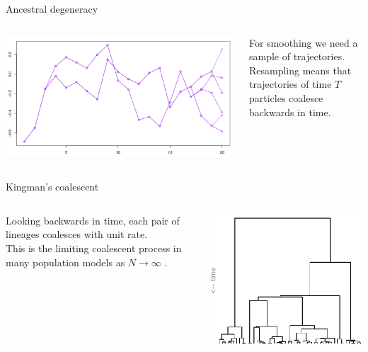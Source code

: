 \documentclass[aspectratio=169]{beamer}
\theoremstyle{definition}
\begin{document}
\begin{frame}{Ancestral degeneracy}
\begin{columns}
\begin{column}{0.6\textwidth}
\includegraphics[width=\textwidth]{../degeneracy.pdf}
\end{column}
\begin{column}{0.35\textwidth}
For smoothing we need a sample of trajectories.\\[7pt]
Resampling means that trajectories of time $T$ particles coalesce backwards in time.
\end{column}
\end{columns}
\end{frame}

\begin{frame}{Kingman's coalescent}
\begin{columns}
\begin{column}{0.45\textwidth}
Looking backwards in time, each pair of lineages coalesces with unit rate.\\[7pt]
This is the limiting coalescent process in many population models as $N\to\infty$ \cite{kingman1982coal, mohle1998}.
\end{column}
\begin{column}{0.45\textwidth}
\includegraphics[width=\textwidth]{../kingman.png}
\end{column}
\end{columns}
\end{frame}
\end{document}
